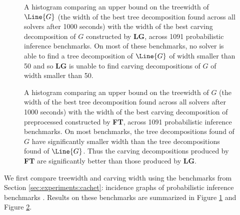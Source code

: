 

% 	

\begin{figure}
	\centering
	
\caption{\label{fig:wmc-width-lg} A histogram comparing an upper bound on the treewidth of $\Line{G}$ (the width of the best tree decomposition found across all solvers after 1000 seconds) with the width of the best carving decomposition of $G$ constructed by \textbf{LG}, across 1091 probabilistic inference benchmarks. On most of these benchmarks, no solver is able to find a tree decomposition of $\Line{G}$ of width smaller than 50 and so \textbf{LG} is unable to find carving decompositions of $G$ of width smaller than 50.}
\end{figure}

\begin{figure}
	\centering
	
\caption{\label{fig:wmc-width-ft} A histogram comparing an upper bound on the treewidth of $G$ (the width of the best tree decomposition found across all solvers after 1000 seconds) with the width of the best carving decomposition of preprocessed constructed by \textbf{FT}, across 1091 probabilistic inference benchmarks. On most benchmarks, the tree decompositions found of $G$ have significantly smaller width than the tree decompositions found of $\Line{G}$. Thus the carving decompositions produced by \textbf{FT} are significantly better than those produced by \textbf{LG}.}
\end{figure}

We first compare treewidth and carving width using the benchmarks from Section \ref{sec:experiments:cachet}: incidence graphs of probabilistic inference benchmarks \cite{SBK05}. Results on these benchmarks are summarized in Figure \ref{fig:wmc-width-lg} and Figure \ref{fig:wmc-width-ft}.

